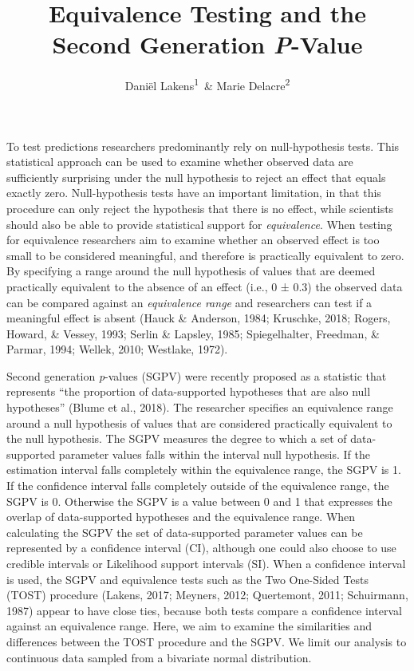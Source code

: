 \documentclass[,man,floatsintext]{apa6}
\title{Equivalence Testing and the Second Generation \emph{P}-Value}
\author{Daniël Lakens\textsuperscript{1}~\& Marie Delacre\textsuperscript{2}}
\date{}
\affiliation{
\vspace{0.5cm}
\textsuperscript{1} Eindhoven University of Technology, Eindhoven, The Netherlands\\\textsuperscript{2} Service of Analysis of the Data, Université Libre de Bruxelles, Belgium}
\begin{document}
\maketitle

To test predictions researchers predominantly rely on null-hypothesis
tests. This statistical approach can be used to examine whether observed
data are sufficiently surprising under the null hypothesis to reject an
effect that equals exactly zero. Null-hypothesis tests have an important
limitation, in that this procedure can only reject the hypothesis that
there is no effect, while scientists should also be able to provide
statistical support for \emph{equivalence}. When testing for equivalence
researchers aim to examine whether an observed effect is too small to be
considered meaningful, and therefore is practically equivalent to zero.
By specifying a range around the null hypothesis of values that are
deemed practically equivalent to the absence of an effect (i.e., 0 ±
0.3) the observed data can be compared against an \emph{equivalence
range} and researchers can test if a meaningful effect is absent (Hauck
\& Anderson, 1984; Kruschke, 2018; Rogers, Howard, \& Vessey, 1993;
Serlin \& Lapsley, 1985; Spiegelhalter, Freedman, \& Parmar, 1994;
Wellek, 2010; Westlake, 1972).

Second generation \emph{p}-values (SGPV) were recently proposed as a
statistic that represents \enquote{the proportion of data-supported
hypotheses that are also null hypotheses} (Blume et al., 2018). The
researcher specifies an equivalence range around a null hypothesis of
values that are considered practically equivalent to the null
hypothesis. The SGPV measures the degree to which a set of
data-supported parameter values falls within the interval null
hypothesis. If the estimation interval falls completely within the
equivalence range, the SGPV is 1. If the confidence interval falls
completely outside of the equivalence range, the SGPV is 0. Otherwise
the SGPV is a value between 0 and 1 that expresses the overlap of
data-supported hypotheses and the equivalence range. When calculating
the SGPV the set of data-supported parameter values can be represented
by a confidence interval (CI), although one could also choose to use
credible intervals or Likelihood support intervals (SI). When a
confidence interval is used, the SGPV and equivalence tests such as the
Two One-Sided Tests (TOST) procedure (Lakens, 2017; Meyners, 2012;
Quertemont, 2011; Schuirmann, 1987) appear to have close ties, because
both tests compare a confidence interval against an equivalence range.
Here, we aim to examine the similarities and differences between the
TOST procedure and the SGPV. We limit our analysis to continuous data
sampled from a bivariate normal distribution.
\end{document}
